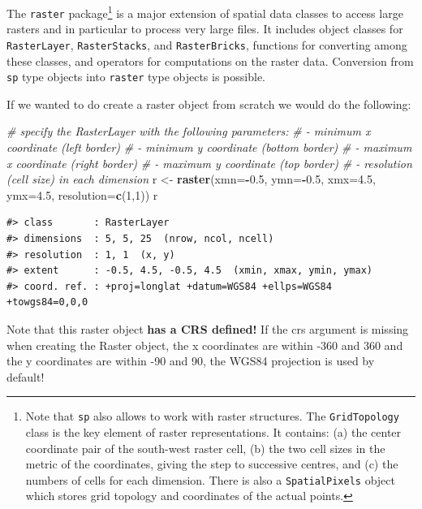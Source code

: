 \documentclass[]{book}
\newenvironment{Shaded}{\begin{snugshade}}{\end{snugshade}}
\newcommand{\KeywordTok}[1]{\textcolor[rgb]{0.13,0.29,0.53}{\textbf{#1}}}
\newcommand{\DataTypeTok}[1]{\textcolor[rgb]{0.13,0.29,0.53}{#1}}
\newcommand{\DecValTok}[1]{\textcolor[rgb]{0.00,0.00,0.81}{#1}}
\newcommand{\FloatTok}[1]{\textcolor[rgb]{0.00,0.00,0.81}{#1}}
\newcommand{\StringTok}[1]{\textcolor[rgb]{0.31,0.60,0.02}{#1}}
\newcommand{\CommentTok}[1]{\textcolor[rgb]{0.56,0.35,0.01}{\textit{#1}}}
\newcommand{\OperatorTok}[1]{\textcolor[rgb]{0.81,0.36,0.00}{\textbf{#1}}}
\newcommand{\NormalTok}[1]{#1}
\let\rmarkdownfootnote\footnote%
\def\footnote{\protect\rmarkdownfootnote}
\begin{document}
The \texttt{raster} package\footnote{Note that \texttt{sp} also allows
  to work with raster structures. The \texttt{GridTopology} class is the
  key element of raster representations. It contains: (a) the center
  coordinate pair of the south-west raster cell, (b) the two cell sizes
  in the metric of the coordinates, giving the step to successive
  centres, and (c) the numbers of cells for each dimension. There is
  also a \texttt{SpatialPixels} object which stores grid topology and
  coordinates of the actual points.} is a major extension of spatial
data classes to access large rasters and in particular to process very
large files. It includes object classes for \texttt{RasterLayer},
\texttt{RasterStacks}, and \texttt{RasterBricks}, functions for
converting among these classes, and operators for computations on the
raster data. Conversion from \texttt{sp} type objects into
\texttt{raster} type objects is possible.

If we wanted to do create a raster object from scratch we would do the
following:

\begin{Shaded}
\begin{Highlighting}[]
\CommentTok{# specify the RasterLayer with the following parameters:}
\CommentTok{# - minimum x coordinate (left border)}
\CommentTok{# - minimum y coordinate (bottom border)}
\CommentTok{# - maximum x coordinate (right border)}
\CommentTok{# - maximum y coordinate (top border)}
\CommentTok{# - resolution (cell size) in each dimension}
\NormalTok{r <-}\StringTok{ }\KeywordTok{raster}\NormalTok{(}\DataTypeTok{xmn=}\OperatorTok{-}\FloatTok{0.5}\NormalTok{, }\DataTypeTok{ymn=}\OperatorTok{-}\FloatTok{0.5}\NormalTok{, }\DataTypeTok{xmx=}\FloatTok{4.5}\NormalTok{, }\DataTypeTok{ymx=}\FloatTok{4.5}\NormalTok{, }\DataTypeTok{resolution=}\KeywordTok{c}\NormalTok{(}\DecValTok{1}\NormalTok{,}\DecValTok{1}\NormalTok{))}
\NormalTok{r}
\end{Highlighting}
\end{Shaded}

\begin{verbatim}
#> class       : RasterLayer 
#> dimensions  : 5, 5, 25  (nrow, ncol, ncell)
#> resolution  : 1, 1  (x, y)
#> extent      : -0.5, 4.5, -0.5, 4.5  (xmin, xmax, ymin, ymax)
#> coord. ref. : +proj=longlat +datum=WGS84 +ellps=WGS84 +towgs84=0,0,0
\end{verbatim}

Note that this raster object \textbf{has a CRS defined!} If the crs
argument is missing when creating the Raster object, the x coordinates
are within -360 and 360 and the y coordinates are within -90 and 90, the
WGS84 projection is used by default!
\end{document}
